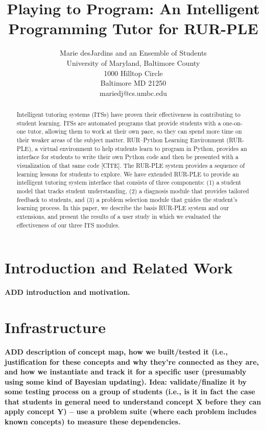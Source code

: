 \documentclass[twocolumn]{article}
\title{Playing to Program:  An Intelligent Programming Tutor for RUR-PLE}
\author{Marie desJardins and an Ensemble of Students \\
University of Maryland, Baltimore County \\ 
1000 Hilltop Circle \\
Baltimore MD  21250 \\
mariedj@cs.umbc.edu
}
\newcommand{\fix}[1]{{\bf #1}}
\begin{document}
\maketitle

\begin{abstract}
Intelligent tutoring systems (ITSs) have proven their effectiveness in
contributing to student learning.  ITSs are automated programs
that provide students with a one-on-one tutor, allowing them to work
at their own pace, so they can spend more time on their weaker areas
of the subject matter.  RUR--Python Learning Environment (RUR-PLE), a
virtual environment to help 
students learn to program in Python, provides an interface for
students to write their own Python code and then be presented with a
visualization of that same code [CITE].  
The RUR-PLE system provides a sequence of learning lessons for
students to explore.  We have extended RUR-PLE to provide an
intelligent tutoring system interface that consists of three
components: 
 (1) a student model that tracks student understanding, 
(2) a diagnosis module
that provides tailored feedback to students, and 
(3) a problem selection
module that guides the student's learning process.  In this paper, we
describe the basis RUR-PLE system and our extensions, and present the
results of a user study in which we evaluated the effectiveness of our
three ITS modules.
\end{abstract}

\section{Introduction and Related Work}
\label{sec:intro}

\fix{ADD introduction and motivation.}

\section{Infrastructure}
\label{sec:student-model}

\fix{ADD description of concept map, how we built/tested it 
(i.e., justification for these concepts and why they're
connected as they are, and how we instantiate and track it for a
specific user (presumably using some kind of Bayesian updating).  
Idea:  validate/finalize it by some testing process on
a group of students (i.e., is it in fact the case that students in
general need to understand concept X before they can apply concept Y)
-- use a problem suite (where each problem includes known concepts)
to measure these dependencies.} 
\end{document}
